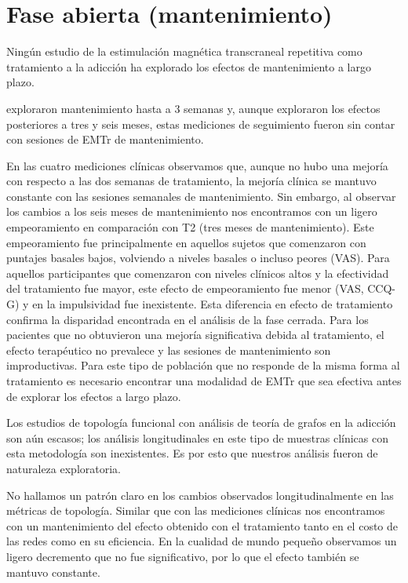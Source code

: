 \section{Fase abierta (mantenimiento)}
Ningún estudio de la estimulación magnética transcraneal repetitiva como tratamiento a la adicción ha explorado los efectos de mantenimiento a largo plazo.\par
\textcite{Terraneo2016} exploraron mantenimiento hasta a 3 semanas y, aunque \textcite{Bolloni2016} exploraron los efectos posteriores a tres y seis meses, estas mediciones de seguimiento  fueron sin contar con sesiones de EMTr de mantenimiento.\par
En las cuatro mediciones clínicas observamos que, aunque no hubo una mejoría con respecto a las dos semanas de tratamiento, la mejoría clínica se mantuvo constante con las sesiones semanales de mantenimiento.
Sin embargo, al observar los cambios a los seis meses de mantenimiento nos encontramos con un ligero empeoramiento en comparación con T2 (tres meses de mantenimiento). Este empeoramiento fue principalmente en aquellos sujetos que comenzaron con puntajes basales bajos, volviendo a niveles basales o incluso peores (VAS). Para aquellos participantes que comenzaron con niveles clínicos altos y la efectividad del tratamiento fue mayor, este efecto de empeoramiento fue menor (VAS, CCQ-G) y en la impulsividad fue inexistente.
Esta diferencia en efecto de tratamiento confirma la disparidad encontrada en el análisis de la fase cerrada. Para los pacientes que no obtuvieron una mejoría significativa debida al tratamiento, el efecto terapéutico no prevalece y las sesiones de mantenimiento son improductivas. Para este tipo de población que no responde de la misma forma al tratamiento es necesario encontrar una modalidad de EMTr que sea efectiva antes de explorar los efectos a largo plazo.\par
Los estudios de topología funcional con análisis de teoría de grafos en la adicción son aún escasos; los análisis longitudinales en este tipo de muestras clínicas con esta metodología son inexistentes. Es por esto que nuestros análisis fueron de naturaleza exploratoria.\par
No hallamos un patrón claro en los cambios observados longitudinalmente en las métricas de topología. Similar que con las mediciones clínicas nos encontramos con un mantenimiento del efecto obtenido con el tratamiento tanto en el costo de las redes como en su eficiencia. En la cualidad de mundo pequeño observamos un ligero decremento que no fue significativo, por lo que el efecto también se mantuvo constante. \par

